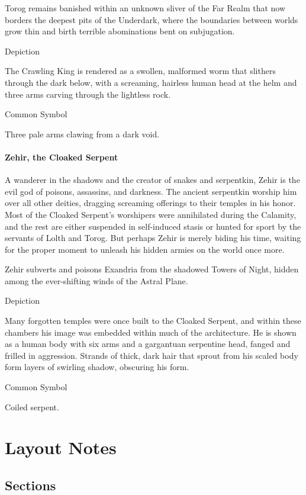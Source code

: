 \documentclass[letterpaper, twocolumn, openany, nodeprecatedcode, layout=true]{dndbook}
\begin{document}
Torog remains banished within an unknown sliver of the Far Realm that now borders the deepest
pits of the Underdark, where the boundaries between worlds grow thin and birth terrible
abominations bent on subjugation.

\subparagraph{Depiction}
The Crawling King is rendered as a swollen, malformed worm that slithers through the dark
below, with a screaming, hairless human head at the helm and three arms carving through the
lightless rock.

\subparagraph{Common Symbol}
Three pale arms clawing from a dark void.

\subsection{Zehir, the Cloaked Serpent}

A wanderer in the shadows and the creator of snakes and serpentkin, Zehir is the evil
god of poisons, assassins, and darkness. The ancient serpentkin worship him over all
other deities, dragging screaming offerings to their temples in his honor. Most of the
Cloaked Serpent’s worshipers were annihilated during the Calamity, and the rest are
either suspended in self-induced stasis or hunted for sport by the servants of Lolth
and Torog. But perhaps Zehir is merely biding his time, waiting for the proper moment
to unleash his hidden armies on the world once more.

Zehir subverts and poisons Exandria from the shadowed Towers of Night, hidden among the
ever-shifting winds of the Astral Plane.

\subparagraph{Depiction}
Many forgotten temples were once built to the Cloaked Serpent, and within these chambers
his image was embedded within much of the architecture. He is shown as a human body with
six arms and a gargantuan serpentine head, fanged and frilled in aggression. Strands of
thick, dark hair that sprout from his scaled body form layers of swirling shadow,
obscuring his form.

\subparagraph{Common Symbol}
Coiled serpent.

\part{Layout Notes}

\chapter{Sections}
\end{document}
